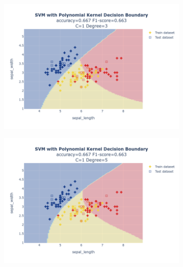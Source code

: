 \documentclass{article}
\begin{document}
\begin{figure}
\begin{subfigure}{0.3\textwidth}
        \includegraphics[scale=.13]{images/implementation/q1/polynomial_kernel/sepal_length_sepal_width_1_3.png}
    \end{subfigure}
    \hfill
    \begin{subfigure}{0.3\textwidth}
        \centering
        \includegraphics[scale=.13]{images/implementation/q1/polynomial_kernel/sepal_length_sepal_width_1_5.png}
    \end{subfigure}
    \hfill
    \begin{subfigure}{0.3\textwidth}
        \centering

\end{subfigure}
\end{figure}
\end{document}
